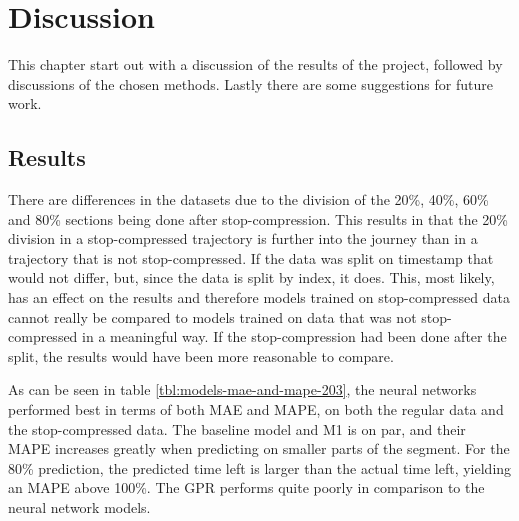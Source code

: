 
\chapter{Discussion}
\label{cha:discussion}

This chapter start out with a discussion of the results of the project, followed by discussions of the chosen methods. Lastly there are some suggestions for future work.

\section{Results}
\label{sec:discussion-results} 
There are differences in the datasets due to the division of the 20\%, 40\%, 60\% and 80\% sections being done after stop-compression. This results in that the 20\% division in a stop-compressed trajectory is further into the journey than in a trajectory that is not stop-compressed. If the data was split on timestamp that would not differ, but, since the data is split by index, it does. This, most likely, has an effect on the results and therefore models trained on stop-compressed data cannot really be compared to models trained on data that was not stop-compressed in a meaningful way. If the stop-compression had been done after the split, the results would have been more reasonable to compare.

As can be seen in table \ref{tbl:models-mae-and-mape-203}, the neural networks performed best in terms of both MAE and MAPE, on both the regular data and the stop-compressed data. The baseline model and M1 is on par, and their MAPE increases greatly when predicting on smaller parts of the segment. For the 80\% prediction, the predicted time left is larger than the actual time left, yielding an MAPE above 100\%. The GPR performs quite poorly in comparison to the neural network models.

